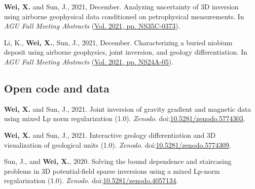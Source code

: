\documentclass[11pt, a4paper]{article}
\newcommand{\LastName}{Wei}
\newcommand{\Initials}{X}
\newcommand{\Wei}{\textbf{\LastName, \Initials.}}  %
\newcommand{\WeiSun}{\textbf{\LastName, \Initials.} and Sun, J.}  %
\newcommand{\DOI}[1]{doi:\href{https://doi.org/#1}{#1}}
\begin{document}
\begin{etaremune}
	\item
	\WeiSun, 2021, December. Analyzing uncertainty of 3D inversion using airborne geophysical data conditioned on petrophysical measurements. In \emph{AGU Fall Meeting Abstracts} (\href{https://ui.adsabs.harvard.edu/abs/2021AGUFMNS35C0373W/abstract}{Vol. 2021, pp. NS35C-0373}).

	\item
	Li, K., \Wei, Sun, J., 2021, December. Characterizing a buried niobium deposit using airborne geophysics, joint inversion, and geology differentiation. In \emph{AGU Fall Meeting Abstracts} (\href{https://ui.adsabs.harvard.edu/abs/2021AGUFMNS24A..05L/abstract}{Vol. 2021, pp. NS24A-05}).

\end{etaremune}


\subsection*{Open code and data}
\begin{etaremune}

	\item
	\WeiSun, 2021. Joint inversion of gravity gradient and magnetic data using mixed Lp norm regularization (1.0). \emph{Zenodo}. \DOI{10.5281/zenodo.5774303}.

	\item
	\WeiSun, 2021. Interactive geology differentiation and 3D visualization of geological units (1.0). \emph{Zenodo}. \DOI{10.5281/zenodo.5774309}.

	\item
	Sun, J., and \Wei, 2020. Solving the bound dependence and staircasing problems in 3D potential-field sparse inversions using a mixed Lp-norm regularization (1.0). \emph{Zenodo}. \DOI{10.5281/zenodo.4057134}.

\end{etaremune}




\end{document}

